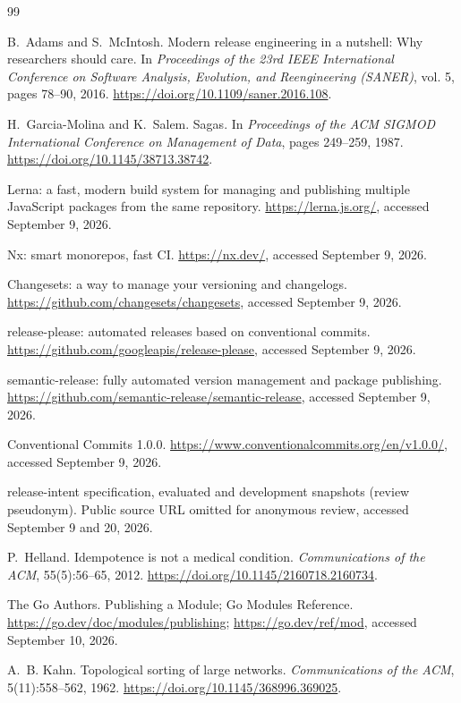 \begin{thebibliography}{99}

B.~Adams and S.~McIntosh.
Modern release engineering in a nutshell: Why researchers should care.
In \emph{Proceedings of the 23rd IEEE International Conference on
Software Analysis, Evolution, and Reengineering (SANER)}, vol. 5, pages 78--90, 2016.
\url{https://doi.org/10.1109/saner.2016.108}.

H.~Garcia-Molina and K.~Salem.
Sagas.
In \emph{Proceedings of the ACM SIGMOD International Conference on
Management of Data}, pages 249--259, 1987.
\url{https://doi.org/10.1145/38713.38742}.

Lerna: a fast, modern build system for managing and publishing multiple
JavaScript packages from the same repository.
\url{https://lerna.js.org/}, accessed September 9, 2026.

Nx: smart monorepos, fast CI.
\url{https://nx.dev/}, accessed September 9, 2026.

Changesets: a way to manage your versioning and changelogs.
\url{https://github.com/changesets/changesets}, accessed September 9, 2026.

release-please: automated releases based on conventional commits.
\url{https://github.com/googleapis/release-please}, accessed September 9, 2026.

semantic-release: fully automated version management and package
publishing.
\url{https://github.com/semantic-release/semantic-release},
accessed September 9, 2026.

Conventional Commits 1.0.0.
\url{https://www.conventionalcommits.org/en/v1.0.0/}, accessed September 9, 2026.

\lang{} release-intent specification, evaluated and development snapshots
(review pseudonym).
Public source URL omitted for anonymous review,
accessed September 9 and 20, 2026.

P.~Helland.
Idempotence is not a medical condition.
\emph{Communications of the ACM}, 55(5):56--65, 2012.
\url{https://doi.org/10.1145/2160718.2160734}.

The Go Authors.
Publishing a Module; Go Modules Reference.
\url{https://go.dev/doc/modules/publishing}; \url{https://go.dev/ref/mod},
accessed September 10, 2026.

A.~B. Kahn.
Topological sorting of large networks.
\emph{Communications of the ACM}, 5(11):558--562, 1962.
\url{https://doi.org/10.1145/368996.369025}.


\end{thebibliography}
